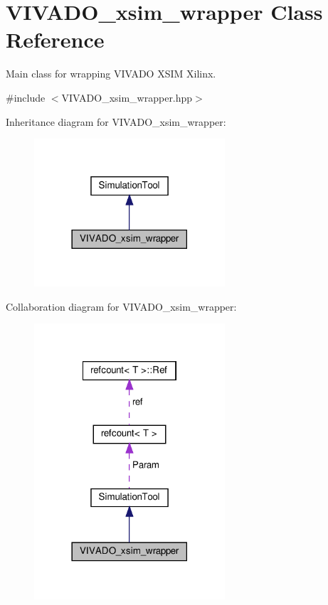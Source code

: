\hypertarget{classVIVADO__xsim__wrapper}{}\section{V\+I\+V\+A\+D\+O\+\_\+xsim\+\_\+wrapper Class Reference}
\label{classVIVADO__xsim__wrapper}


Main class for wrapping V\+I\+V\+A\+DO X\+S\+IM Xilinx.  




{\ttfamily \#include $<$V\+I\+V\+A\+D\+O\+\_\+xsim\+\_\+wrapper.\+hpp$>$}



Inheritance diagram for V\+I\+V\+A\+D\+O\+\_\+xsim\+\_\+wrapper\+:
\nopagebreak
\begin{figure}[H]
\begin{center}
\leavevmode
\includegraphics[width=201pt]{da/d6d/classVIVADO__xsim__wrapper__inherit__graph}
\end{center}
\end{figure}


Collaboration diagram for V\+I\+V\+A\+D\+O\+\_\+xsim\+\_\+wrapper\+:
\nopagebreak
\begin{figure}[H]
\begin{center}
\leavevmode
\includegraphics[width=201pt]{db/dda/classVIVADO__xsim__wrapper__coll__graph}
\end{center}
\end{figure}
